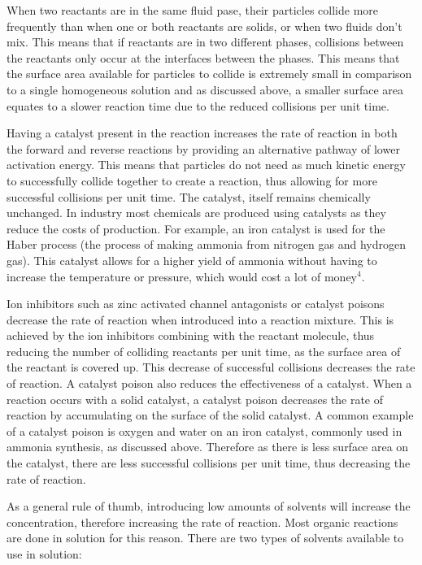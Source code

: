 When two reactants are in the same fluid pase, their particles collide more frequently than when one or both reactants are solids, or when two fluids don't mix. This means that if reactants are in two different phases, collisions between the reactants only occur at the interfaces between the phases. This means that the surface area available for particles to collide is extremely small in comparison to a single homogeneous solution and as discussed above, a smaller surface area equates to a slower reaction time due to the reduced collisions per unit time.

Having a catalyst present in the reaction increases the rate of reaction in both the forward and reverse reactions by providing an alternative pathway of lower activation energy. This means that particles do not need as much kinetic energy to successfully collide together to create a reaction, thus allowing for more successful collisions per unit time. The catalyst, itself remains chemically unchanged. In industry most chemicals are produced using catalysts as they reduce the costs of production. For example, an iron catalyst is used for the Haber process (the process of making ammonia from nitrogen gas and hydrogen gas). This catalyst allows for a higher yield of ammonia without having to increase the temperature or pressure, which would cost a lot of money$^4$.

Ion inhibitors such as zinc activated channel antagonists or catalyst poisons decrease the rate of reaction when introduced into a reaction mixture. This is achieved by the ion inhibitors combining with the reactant molecule, thus reducing the number of colliding reactants per unit time, as the surface area of the reactant is covered up. This decrease of successful collisions decreases the rate of reaction. A catalyst poison also reduces the effectiveness of a catalyst. When a reaction occurs with a solid catalyst, a catalyst poison decreases the rate of reaction by accumulating on the surface of the solid catalyst. A common example of a catalyst poison is oxygen and water on an iron catalyst, commonly used in ammonia synthesis, as discussed above. Therefore as there is less surface area on the catalyst, there are less successful collisions per unit time, thus decreasing the rate of reaction.

As a general rule of thumb, introducing low amounts of solvents will increase the concentration, therefore increasing the rate of reaction. Most organic reactions are done in solution for this reason. There are two types of solvents available to use in solution:

